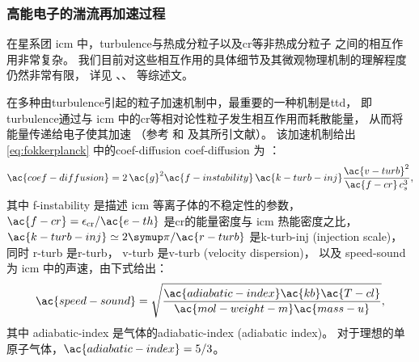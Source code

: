 \subsubsection{高能电子的湍流再加速过程}

在星系团 \ac{icm} 中，\ac{turbulence}与热成分粒子以及\ac{cr}等非热成分粒子
之间的相互作用非常复杂。
我们目前对这些相互作用的具体细节及其微观物理机制的理解程度仍然非常有限，
详见 、、
 等综述文。

在多种由\ac{turbulence}引起的粒子加速机制中，最重要的一种机制是\acf{ttd}，
即\ac{turbulence}通过与 \ac{icm} 中的\ac{cr}等相对论性粒子发生相互作用而耗散能量，
从而将能量传递给电子使其加速
（参考  和  及其所引文献）。
该加速机制给出\autoref{eq:fokkerplanck}
中的\acl{coef-diffusion} \ac{coef-diffusion} 为
\cite{miniati2015,pinzke2017}：
\begin{equation}
  \ac{coef-diffusion}
    = 2\,\ac{g}^2 \ac{f-instability} \,\ac{k-turb-inj}
      \frac{\ac{v-turb}^2}{\ac{f-cr} \,c_s^3} ,
\end{equation}
其中
\ac{f-instability} 是描述 \ac{icm} 等离子体的不稳定性的参数，
$\ac{f-cr} = \epsilon_{\R{cr}} / \ac{e-th}$
是\ac{cr}的能量密度与 \ac{icm} 热能密度之比，
$\ac{k-turb-inj} \simeq 2\Cpi / \ac{r-turb}$
是\acl{k-turb-inj} (injection scale)，
同时 \ac{r-turb} 是\acl{r-turb}，
\ac{v-turb} 是\acl{v-turb} (velocity dispersion)，
以及 \ac{speed-sound} 为 \ac{icm} 中的声速，由下式给出：
\begin{equation}
  \ac{speed-sound}
    = \sqrt{\frac{\ac{adiabatic-index} \ac{kb} \ac{T-cl}}{
        \ac{mol-weight-m} \ac{mass-u}}} ,
\end{equation}
其中 \ac{adiabatic-index} 是气体的\acl{adiabatic-index} (adiabatic index)。
对于理想的单原子气体，$\ac{adiabatic-index} = 5/3$。

